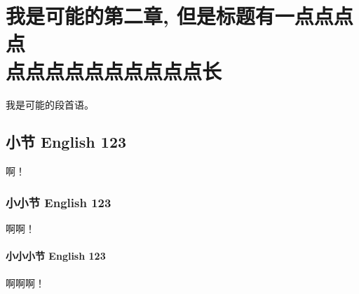 \chapter{我是可能的第二章, 但是标题有一点点点点\\点点点点点点点点点点长}
\label{chap:fundamental}

我是可能的段首语。

\section{小节 English 123}
\label{sec:funda:1}

啊！

\subsection{小小节 English 123}
\label{sec:funda:1:1}

啊啊！

\subsubsection{小小小节 English 123}
\label{sec:funda:1:1:1}

啊啊啊！